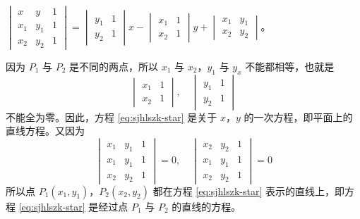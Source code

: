 \zhengming $
    \begin{vmatrix*}
        x   & y   & 1 \\
        x_1 & y_1 & 1 \\
        x_2 & y_2 & 1
    \end{vmatrix*}
    =   \begin{vmatrix*}
            y_1 & 1 \\
            y_2 & 1
        \end{vmatrix*} x
      - \begin{vmatrix*}
            x_1 & 1 \\
            x_2 & 1
        \end{vmatrix*} y
      + \begin{vmatrix*}
            x_1 & y_1 \\
            x_2 & y_2
        \end{vmatrix*}
$。

因为 $P_1$ 与 $P_2$ 是不同的两点，所以 $x_1$ 与 $x_2$，$y_1$ 与 $y_x$ 不能都相等，也就是
$$
\begin{vmatrix*}
    x_1 & 1 \\
    x_2 & 1
\end{vmatrix*}, \quad
\begin{vmatrix*}
    y_1 & 1 \\
    y_2 & 1
\end{vmatrix*}
$$
不能全为零。因此，方程 \eqref{eq:sjhlszk-star} 是关于 $x$，$y$ 的一次方程，即平面上的直线方程。又因为
$$
\begin{vmatrix*}
    x_1 & y_1 & 1 \\
    x_1 & y_1 & 1 \\
    x_2 & y_2 & 1
\end{vmatrix*} = 0,\quad
\begin{vmatrix*}
    x_2 & y_2 & 1 \\
    x_1 & y_1 & 1 \\
    x_2 & y_2 & 1
\end{vmatrix*} = 0
$$
所以点 $P_1(x_1, y_1)$，$P_2(x_2, y_2)$ 都在方程 \eqref{eq:sjhlszk-star}
表示的直线上，即方程 \eqref{eq:sjhlszk-star} 是经过点 $P_1$ 与 $P_2$ 的直线的方程。



